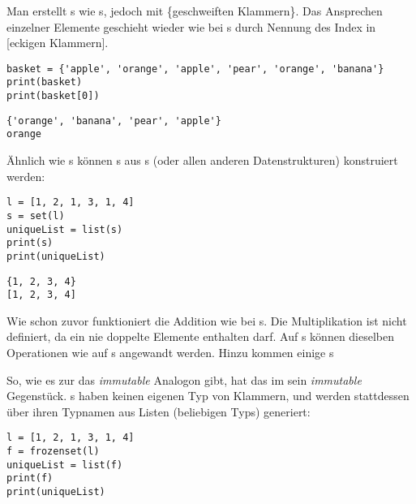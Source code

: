 Man erstellt s wie s, jedoch mit \{geschweiften Klammern\}. Das Ansprechen einzelner Elemente geschieht wieder wie bei s durch Nennung des Index in [eckigen Klammern]. 

\begin{codebox}
\begin{verbatim}
basket = {'apple', 'orange', 'apple', 'pear', 'orange', 'banana'}
print(basket)
print(basket[0])
\end{verbatim}
\end{codebox}

\begin{cmdbox}[Ausgabe]
\begin{verbatim}
{'orange', 'banana', 'pear', 'apple'}
orange
\end{verbatim}
\end{cmdbox}

Ähnlich wie s können s aus s (oder allen anderen Datenstrukturen) konstruiert werden:

\begin{codebox}
\begin{verbatim}
l = [1, 2, 1, 3, 1, 4]
s = set(l)
uniqueList = list(s)
print(s)
print(uniqueList)
\end{verbatim}
\end{codebox}

\begin{cmdbox}[Ausgabe]
\begin{verbatim}
{1, 2, 3, 4}
[1, 2, 3, 4]
\end{verbatim}
\end{cmdbox}

Wie schon zuvor funktioniert die Addition wie bei s. Die Multiplikation ist nicht definiert, da ein  nie doppelte Elemente enthalten darf. Auf s können dieselben Operationen wie auf s angewandt werden. Hinzu kommen einige s

So, wie es zur  das \emph{immutable} Analogon  gibt, hat das  im  sein \emph{immutable} Gegenstück. s haben keinen eigenen Typ von Klammern, und werden stattdessen über ihren Typnamen aus Listen (beliebigen Typs) generiert:

\begin{codebox}
\begin{verbatim}
l = [1, 2, 1, 3, 1, 4]
f = frozenset(l)
uniqueList = list(f)
print(f)
print(uniqueList)
\end{verbatim}
\end{codebox}

